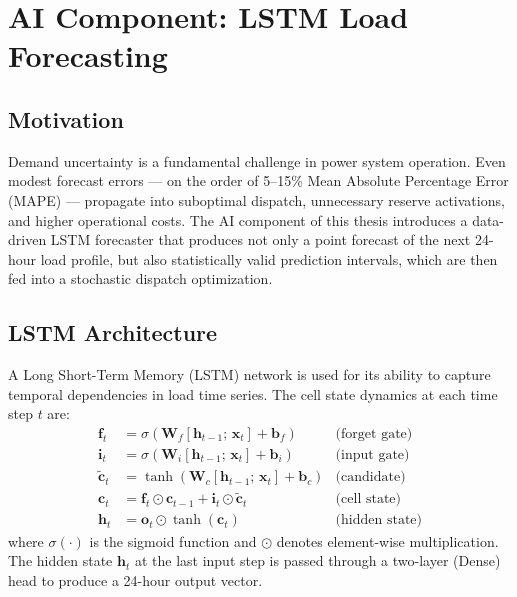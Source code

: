 \section{AI Component: LSTM Load Forecasting}
\label{sec:lstm_math}

\subsection{Motivation}

Demand uncertainty is a fundamental challenge in power system operation. Even modest forecast errors --- on the order of 5--15\% Mean Absolute Percentage Error (MAPE) --- propagate into suboptimal dispatch, unnecessary reserve activations, and higher operational costs. The AI component of this thesis introduces a data-driven LSTM forecaster that produces not only a point forecast of the next 24-hour load profile, but also statistically valid prediction intervals, which are then fed into a stochastic dispatch optimization.

\subsection{LSTM Architecture}

A Long Short-Term Memory (LSTM) network \cite{hochreiter1997lstm} is used for its ability to capture temporal dependencies in load time series. The cell state dynamics at each time step $t$ are:
\begin{align}
    \mathbf{f}_t &= \sigma(\mathbf{W}_f[\mathbf{h}_{t-1};\,\mathbf{x}_t] + \mathbf{b}_f) & \text{(forget gate)} \\
    \mathbf{i}_t &= \sigma(\mathbf{W}_i[\mathbf{h}_{t-1};\,\mathbf{x}_t] + \mathbf{b}_i) & \text{(input gate)} \\
    \tilde{\mathbf{c}}_t &= \tanh(\mathbf{W}_c[\mathbf{h}_{t-1};\,\mathbf{x}_t] + \mathbf{b}_c) & \text{(candidate)} \\
    \mathbf{c}_t &= \mathbf{f}_t \odot \mathbf{c}_{t-1} + \mathbf{i}_t \odot \tilde{\mathbf{c}}_t & \text{(cell state)} \\
    \mathbf{h}_t &= \mathbf{o}_t \odot \tanh(\mathbf{c}_t) & \text{(hidden state)}
\end{align}
where $\sigma(\cdot)$ is the sigmoid function and $\odot$ denotes element-wise multiplication. The hidden state $\mathbf{h}_{t}$ at the last input step is passed through a two-layer (Dense) head to produce a 24-hour output vector.

